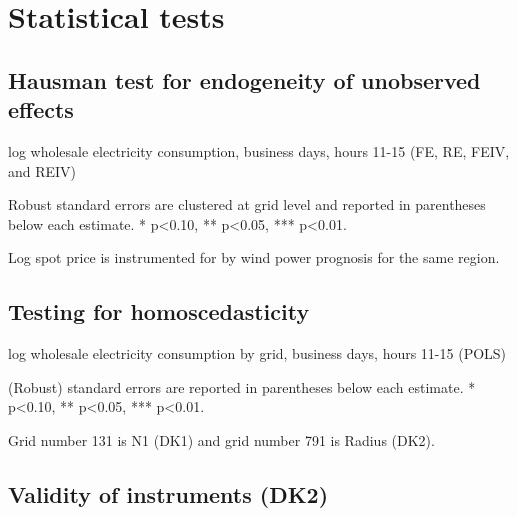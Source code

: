 \section{Statistical tests}
\label{app:statistical_tests}

\subsection{Hausman test for endogeneity of unobserved effects}
\label{app:hausman}
\begin{table}[H]
\centering
\begin{threeparttable}
  \caption{log wholesale electricity consumption, business days, hours 11-15 (FE, RE, FEIV, and REIV)}
  \label{tab:ws_fe}
  \footnotesize
    
    \begin{tablenotes}
    \item Robust standard errors are clustered at grid level and reported in parentheses below each estimate. * p<0.10, ** p<0.05, *** p<0.01.
    \item Log spot price is instrumented for by wind power prognosis for the same region.
  \end{tablenotes}
\end{threeparttable}
\end{table}

\clearpage

\subsection{Testing for homoscedasticity}
\label{app:homoscedasticity}
\begin{table}[H]
\centering
\begin{threeparttable}
  \caption{log wholesale electricity consumption by grid, business days, hours 11-15 (POLS)}
  \label{tab:ws_homoscedasticity}
  \footnotesize
    
    \begin{tablenotes}
    \item (Robust) standard errors are reported in parentheses below each estimate. * p<0.10, ** p<0.05, *** p<0.01.
    \item Grid number 131 is N1 (DK1) and grid number 791 is Radius (DK2).
  \end{tablenotes}
\end{threeparttable}
\end{table}

\clearpage

\subsection{Validity of instruments (DK2)}
\label{app:validity}

